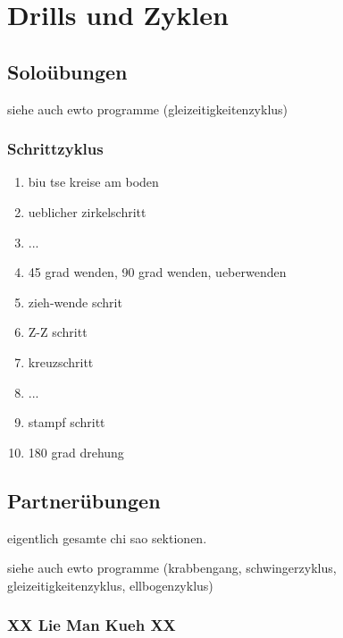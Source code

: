 

\renewcommand\chapterillustration{pushing_minimalistisch}
\chapter{Drills und Zyklen}


\section{Solo\"ubungen}

siehe auch ewto programme (gleizeitigkeitenzyklus)

\subsection{Schrittzyklus}

\begin{enumerate}
	\item biu tse kreise am boden
	\item ueblicher zirkelschritt
	\item ...
	\item 45 grad wenden, 90 grad wenden, ueberwenden
	\item zieh-wende schrit
	\item Z-Z schritt
	\item kreuzschritt
	\item ...
	\item stampf schritt
	\item 180 grad drehung
\end{enumerate}

\section{Partner\"ubungen}

eigentlich gesamte chi sao sektionen.

siehe auch ewto programme (krabbengang, schwingerzyklus, gleizeitigkeitenzyklus, ellbogenzyklus)

\subsection{XX Lie Man Kueh XX}

